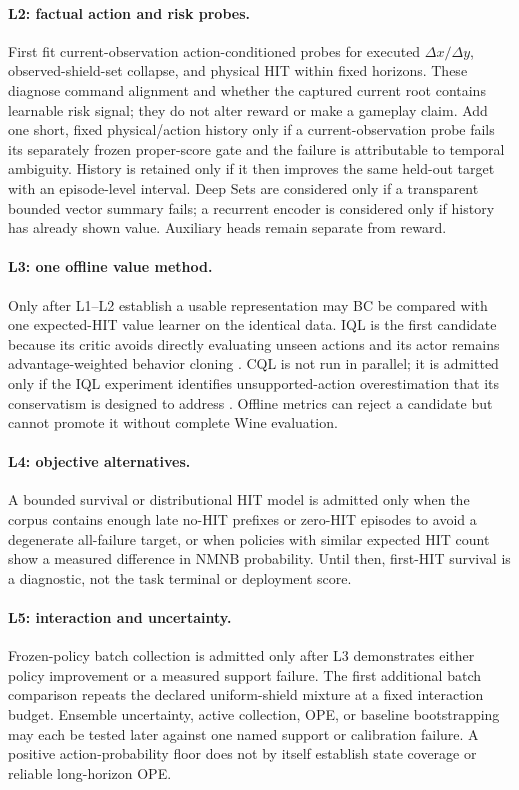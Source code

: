 \documentclass[11pt]{article}
\begin{document}
\paragraph{L2: factual action and risk probes.}
First fit current-observation action-conditioned probes for executed
$\Delta x/\Delta y$, observed-shield-set collapse, and physical HIT within
fixed horizons.  These diagnose command alignment and whether the captured
current root contains learnable risk signal; they do not alter reward or make
a gameplay claim.  Add one short, fixed physical/action history only if a
current-observation probe fails its separately frozen proper-score gate and
the failure is attributable to temporal ambiguity.  History is retained only
if it then improves the same held-out target with an episode-level interval.
Deep Sets
\citep{zaheer2017deepsets} are considered only if a transparent bounded vector
summary fails; a recurrent encoder is considered only if history has already
shown value.  Auxiliary heads remain separate from reward.

\paragraph{L3: one offline value method.}
Only after L1--L2 establish a usable representation may BC be compared with
one expected-HIT value learner on the identical data.  IQL is the first
candidate because its critic avoids directly evaluating unseen actions and its
actor remains advantage-weighted behavior cloning
\citep{kostrikov2022iql}.  CQL is not run in parallel; it is admitted only if
the IQL experiment identifies unsupported-action overestimation that its
conservatism is designed to address \citep{kumar2020cql}.  Offline metrics can
reject a candidate but cannot promote it without complete Wine evaluation.

\paragraph{L4: objective alternatives.}
A bounded survival or distributional HIT model is admitted only when the
corpus contains enough late no-HIT prefixes or zero-HIT episodes to avoid a
degenerate all-failure target, or when policies with similar expected HIT count
show a measured difference in NMNB probability.  Until then, first-HIT
survival is a diagnostic, not the task terminal or deployment score.

\paragraph{L5: interaction and uncertainty.}
Frozen-policy batch collection is admitted only after L3 demonstrates either
policy improvement or a measured support failure.  The first additional batch
comparison repeats the declared uniform-shield mixture at a fixed interaction
budget.  Ensemble uncertainty, active collection, OPE, or baseline
bootstrapping may each be tested later against one named support or calibration
failure.  A positive action-probability floor does not by itself establish
state coverage or reliable long-horizon OPE.
\end{document}

